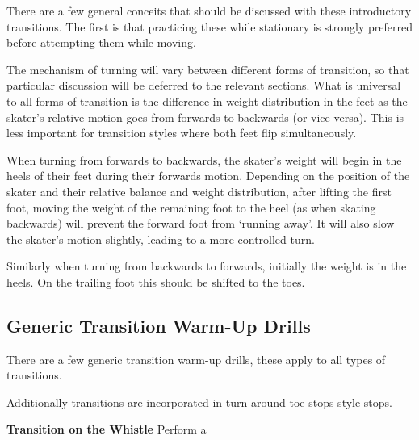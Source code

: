 There are a few general conceits that should be discussed with these introductory transitions. The first is that practicing these while stationary is strongly preferred before attempting them while moving. 



The mechanism of turning will vary between different forms of transition, so that particular discussion will be deferred to the relevant sections.   
What is universal to all forms of transition is the difference in weight distribution in the feet as the skater's relative motion goes from forwards to backwards (or vice versa).   
This is less important for transition styles where both feet flip simultaneously.       


When turning from forwards to backwards, the skater's weight will begin in the heels of their feet during their forwards motion. 
Depending on the position of the skater and their relative balance and weight distribution, after lifting the first foot, moving the weight of the remaining foot to the heel (as when skating backwards) will prevent the forward foot from `running away'. It will also slow the skater's motion slightly, leading to a more controlled turn.     


Similarly when turning from backwards to forwards, initially the weight is in the heels. On the trailing foot this should be shifted to the toes. 


\subsection*{Generic Transition Warm-Up Drills}
There are a few generic transition warm-up drills, these apply to all types of transitions.

Additionally transitions are incorporated in turn around toe-stops style stops.

{\bf Transition on the Whistle}
Perform a






